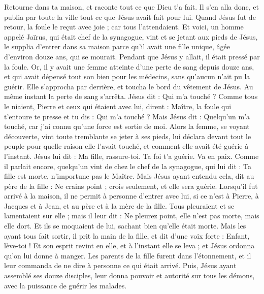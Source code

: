 \begin{multicols}{2}
{Retourne dans ta maison, et raconte tout ce que Dieu t’a fait. Il s'en alla donc, et publia par toute la ville tout ce que Jésus avait fait pour lui.
Quand Jésus fut de retour, la foule le reçut avec joie ; car tous l'attendaient.
Et voici, un homme appelé Jaïrus, qui était chef de la synagogue, vint et se jetant aux pieds de Jésus, le supplia d’entrer dans sa maison
parce qu’il avait une fille unique, âgée d'environ douze ans, qui se mourait. Pendant que Jésus y allait, il était pressé par la foule.
Or, il y avait une femme atteinte d’une perte de sang depuis douze ans, et qui avait dépensé tout son bien pour les médecins, sans qu’aucun n’ait pu la guérir.
Elle s’approcha par derrière, et toucha le bord du vêtement de Jésus. Au même instant la perte de sang s'arrêta.
Jésus dit : Qui m'a touché ? Comme tous le niaient, Pierre et ceux qui étaient avec lui, dirent : Maître, la foule qui t’entoure te presse et tu dis : Qui m'a touché ?
Mais Jésus dit : Quelqu’un m'a touché, car j'ai connu qu'une force est sortie de moi.
Alors la femme, se voyant découverte, vint toute tremblante se jeter à ses pieds, lui déclara devant tout le peuple pour quelle raison elle l'avait touché, et comment elle avait été guérie à l’instant.
Jésus lui dit : Ma fille, rassure-toi. Ta foi t'a guérie. Va en paix.
Comme il parlait encore, quelqu'un vint de chez le chef de la synagogue, qui lui dit : Ta fille est morte, n’importune pas le Maître.
Mais Jésus ayant entendu cela, dit au père de la fille : Ne crains point ; crois seulement, et elle sera guérie.
Lorsqu’il fut arrivé à la maison, il ne permit à personne d’entrer avec lui, si ce n’est à Pierre, à Jacques et à Jean, et au père et à la mère de la fille.
Tous pleuraient et se lamentaient sur elle ; mais il leur dit : Ne pleurez point, elle n'est pas morte, mais elle dort.
Et ils se moquaient de lui, sachant bien qu'elle était morte.
Mais les ayant tous fait sortir, il prit la main de la fille, et dit d’une voix forte : Enfant, lève-toi !
Et son esprit revint en elle, et à l’instant elle se leva ; et Jésus ordonna qu'on lui donne à manger.
Les parents de la fille furent dans l’étonnement, et il leur commanda de ne dire à personne ce qui était arrivé.
\VerseOne{}Puis, Jésus ayant assemblé ses douze disciples, leur donna pouvoir et autorité sur tous les démons, avec la puissance de guérir les malades.
}
\end{multicols}
